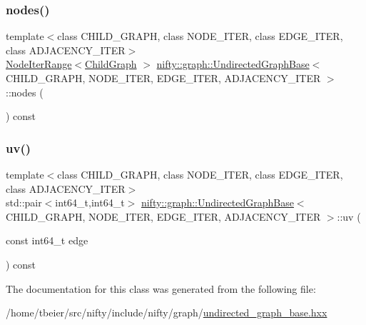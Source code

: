 \subsubsection{\texorpdfstring{nodes()}{nodes()}}
{\footnotesize\ttfamily template$<$class C\+H\+I\+L\+D\+\_\+\+G\+R\+A\+PH, class N\+O\+D\+E\+\_\+\+I\+T\+ER, class E\+D\+G\+E\+\_\+\+I\+T\+ER, class A\+D\+J\+A\+C\+E\+N\+C\+Y\+\_\+\+I\+T\+ER$>$ \\
\hyperlink{structnifty_1_1graph_1_1UndirectedGraphBase_1_1NodeIterRange}{Node\+Iter\+Range}$<$\hyperlink{classnifty_1_1graph_1_1UndirectedGraphBase_af2541cf9fb91440ff0a7b56dd5a6be29}{Child\+Graph} $>$ \hyperlink{classnifty_1_1graph_1_1UndirectedGraphBase}{nifty\+::graph\+::\+Undirected\+Graph\+Base}$<$ C\+H\+I\+L\+D\+\_\+\+G\+R\+A\+PH, N\+O\+D\+E\+\_\+\+I\+T\+ER, E\+D\+G\+E\+\_\+\+I\+T\+ER, A\+D\+J\+A\+C\+E\+N\+C\+Y\+\_\+\+I\+T\+ER $>$\+::nodes (\begin{DoxyParamCaption}{ }\end{DoxyParamCaption}) const\hspace{0.3cm}{\ttfamily [inline]}}

\mbox{\label{classnifty_1_1graph_1_1UndirectedGraphBase_a8d444cdff1ec4d0a8e276f15ce269e3f}} 
\subsubsection{\texorpdfstring{uv()}{uv()}}
{\footnotesize\ttfamily template$<$class C\+H\+I\+L\+D\+\_\+\+G\+R\+A\+PH, class N\+O\+D\+E\+\_\+\+I\+T\+ER, class E\+D\+G\+E\+\_\+\+I\+T\+ER, class A\+D\+J\+A\+C\+E\+N\+C\+Y\+\_\+\+I\+T\+ER$>$ \\
std\+::pair$<$int64\+\_\+t,int64\+\_\+t$>$ \hyperlink{classnifty_1_1graph_1_1UndirectedGraphBase}{nifty\+::graph\+::\+Undirected\+Graph\+Base}$<$ C\+H\+I\+L\+D\+\_\+\+G\+R\+A\+PH, N\+O\+D\+E\+\_\+\+I\+T\+ER, E\+D\+G\+E\+\_\+\+I\+T\+ER, A\+D\+J\+A\+C\+E\+N\+C\+Y\+\_\+\+I\+T\+ER $>$\+::uv (\begin{DoxyParamCaption}\item[{const int64\+\_\+t}]{edge }\end{DoxyParamCaption}) const\hspace{0.3cm}{\ttfamily [inline]}}



The documentation for this class was generated from the following file\+:\begin{DoxyCompactItemize}
\item 
/home/tbeier/src/nifty/include/nifty/graph/\hyperlink{undirected__graph__base_8hxx}{undirected\+\_\+graph\+\_\+base.\+hxx}\end{DoxyCompactItemize}

